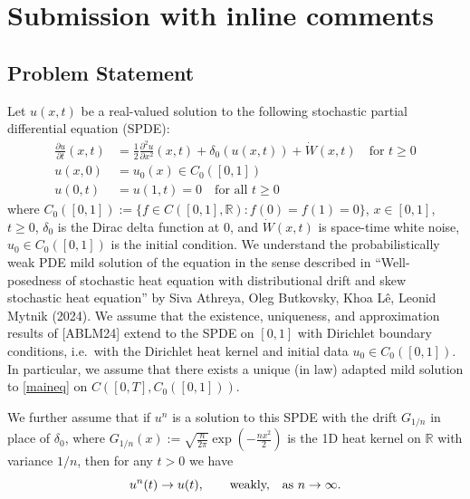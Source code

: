 \documentclass[12pt]{article}
\newcommand{\R}{\mathbb{R}}
\begin{document}
  \section{Submission with inline comments}

\date{}



\subsection*{Problem Statement}

Let $u(x,t)$ be a real-valued solution to the following stochastic partial differential equation (SPDE):
\begin{align}\tag{$*$}\label{maineq}
    \frac{\partial u}{\partial t}(x,t) &= \frac{1}{2} \frac{\partial^2 u}{\partial x^2}(x,t) + \delta_0(u(x,t)) +  \dot{W}(x,t) \quad\text{for }t \geq 0\\
    u(x,0) &= u_0(x)\in C_0([0,1])\nonumber\\
    u(0,t) &= u(1,t)=0\quad\text{for all }t\geq0    \nonumber
\end{align}
where $C_0([0,1]):=\{f\in C([0,1],\R): f(0)=f(1)=0\}$, $x \in [0,1]$, $t \geq 0$, $\delta_0$ is the Dirac delta function at $0$, and $\dot{W}(x,t)$ is space-time white noise, $u_0\in C_0([0,1])$ is the initial condition. We understand the probabilistically weak PDE mild solution of the equation in the sense described in ``Well-posedness of stochastic heat equation with distributional drift and skew stochastic heat equation'' by Siva Athreya, Oleg Butkovsky, Khoa L\^{e}, Leonid Mytnik (2024). 
We assume that the existence, uniqueness, and approximation results of [ABLM24] extend to the SPDE on $[0,1]$ with Dirichlet boundary conditions, i.e.\ with the Dirichlet heat kernel and initial data $u_0\in C_0([0,1])$. In particular, we assume that there exists a unique (in law) adapted mild solution to \eqref{maineq} on $C([0,T],C_0([0,1]))$.

We further assume that if $u^n$ is a solution to this SPDE with the drift $G_{1/n}$ in place of $\delta_0$, where $G_{1/n}(x):=\sqrt{\frac{n}{2\pi}} \exp(-\frac{n x^2}{2})$ is the 1D heat kernel on $\mathbb{R}$ with variance $1/n$, then for any $t>0$ we have 
\begin{equation*}
u^n(t)\to u(t),\qquad\text{weakly, \,\, as $n\to\infty$}.
\end{equation*}
\end{document}
